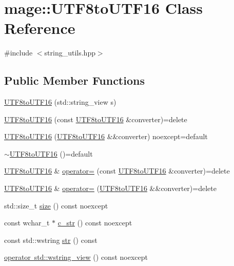 \hypertarget{classmage_1_1_u_t_f8to_u_t_f16}{}\section{mage\+:\+:U\+T\+F8to\+U\+T\+F16 Class Reference}
\label{classmage_1_1_u_t_f8to_u_t_f16}


{\ttfamily \#include $<$string\+\_\+utils.\+hpp$>$}

\subsection*{Public Member Functions}
\begin{DoxyCompactItemize}
\item 
\mbox{\hyperlink{classmage_1_1_u_t_f8to_u_t_f16_a7cfed1091186b2dbc322f03621689d86}{U\+T\+F8to\+U\+T\+F16}} (std\+::string\+\_\+view s)
\item 
\mbox{\hyperlink{classmage_1_1_u_t_f8to_u_t_f16_a90680972e9818f5ce2a6d4df7c71f84e}{U\+T\+F8to\+U\+T\+F16}} (const \mbox{\hyperlink{classmage_1_1_u_t_f8to_u_t_f16}{U\+T\+F8to\+U\+T\+F16}} \&converter)=delete
\item 
\mbox{\hyperlink{classmage_1_1_u_t_f8to_u_t_f16_a88c32a284090985056b4e9765048a759}{U\+T\+F8to\+U\+T\+F16}} (\mbox{\hyperlink{classmage_1_1_u_t_f8to_u_t_f16}{U\+T\+F8to\+U\+T\+F16}} \&\&converter) noexcept=default
\item 
\mbox{\hyperlink{classmage_1_1_u_t_f8to_u_t_f16_acd1fca8331d1c451df0e8fb6bd279ab8}{$\sim$\+U\+T\+F8to\+U\+T\+F16}} ()=default
\item 
\mbox{\hyperlink{classmage_1_1_u_t_f8to_u_t_f16}{U\+T\+F8to\+U\+T\+F16}} \& \mbox{\hyperlink{classmage_1_1_u_t_f8to_u_t_f16_a95032d21282de5434afc242d856cefab}{operator=}} (const \mbox{\hyperlink{classmage_1_1_u_t_f8to_u_t_f16}{U\+T\+F8to\+U\+T\+F16}} \&converter)=delete
\item 
\mbox{\hyperlink{classmage_1_1_u_t_f8to_u_t_f16}{U\+T\+F8to\+U\+T\+F16}} \& \mbox{\hyperlink{classmage_1_1_u_t_f8to_u_t_f16_a3a12e773a6e9faf33fa3d4e11021e792}{operator=}} (\mbox{\hyperlink{classmage_1_1_u_t_f8to_u_t_f16}{U\+T\+F8to\+U\+T\+F16}} \&\&converter)=delete
\item 
std\+::size\+\_\+t \mbox{\hyperlink{classmage_1_1_u_t_f8to_u_t_f16_a454b020d44ae0b06f4908dd1849ad3c1}{size}} () const noexcept
\item 
const wchar\+\_\+t $\ast$ \mbox{\hyperlink{classmage_1_1_u_t_f8to_u_t_f16_a052909628f5d5ee5faf27b734d34d90e}{c\+\_\+str}} () const noexcept
\item 
const std\+::wstring \mbox{\hyperlink{classmage_1_1_u_t_f8to_u_t_f16_a13ed0bb76f581d0318ab5607c5ca6ee9}{str}} () const
\item 
\mbox{\hyperlink{classmage_1_1_u_t_f8to_u_t_f16_a60b48d34ccbe71c5b0fb09822d1785df}{operator std\+::wstring\+\_\+view}} () const noexcept
\end{DoxyCompactItemize}
